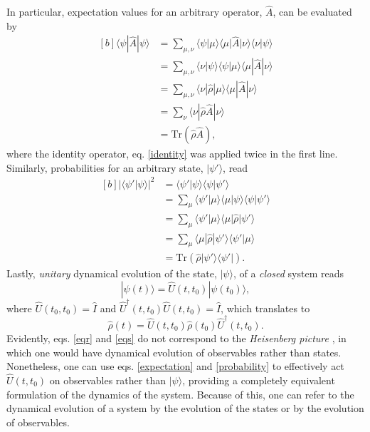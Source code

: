 \documentclass[
12pt,		%
openright,	%
twoside,  %
a4paper,			%
chapter=TITLE,		%
english,			%
french,				%
spanish,			%
brazil				%
]{USPSC-classe/USPSC}
\begin{document}
\begin{apendicesenv}
In particular, expectation values for an arbitrary operator, $\hat{A}$, can be evaluated by
\begin{equation}\label{expectation}
\begin{aligned}[b]
\langle\psi|\hat{A}|\psi\rangle &= \sum_{\mu,\nu}\langle\psi|\mu\rangle\langle\mu|\hat{A}|\nu\rangle\langle\nu|\psi\rangle\\
&=\sum_{\mu,\nu}\langle\nu|\psi\rangle\langle\psi|\mu\rangle\langle\mu|\hat{A}|\nu\rangle\\
&=\sum_{\mu,\nu}\langle\nu|\hat{\rho}|\mu\rangle\langle\mu|\hat{A}|\nu\rangle\\
&=\sum_{\nu}\langle\nu|\hat{\rho}\hat{A}|\nu\rangle\\
&=\text{Tr}\left(\hat{\rho}\hat{A}\right),    
\end{aligned}
\end{equation}
where the identity operator, eq. \ref{identity} was applied twice in the first line. Similarly, probabilities for an arbitrary state, $|\psi'\rangle$, read
\begin{equation}\label{probability}
\begin{aligned}[b]
     |\langle\psi'|\psi\rangle|^2 &= \langle\psi'|\psi\rangle\langle\psi|\psi'\rangle\\
     &=\sum_{\mu}\langle\psi'|{\mu}\rangle\langle{\mu}|\psi\rangle\langle\psi|\psi'\rangle\\
     &=\sum_{\mu}\langle\psi'|{\mu}\rangle\langle{\mu}|\hat{\rho}|\psi'\rangle\\
     &=\sum_{\mu}\langle{\mu}|\hat{\rho}|\psi'\rangle\langle\psi'|{\mu}\rangle\\
     &= \text{Tr}\left(\hat{\rho}|\psi'\rangle\langle\psi'|\right).
     \end{aligned}
 \end{equation}
Lastly, \textit{unitary} dynamical evolution of the state, $|\psi\rangle$, of a \textit{closed} system reads
\begin{equation}\label{eqr}
    |\psi(t)\rangle=\hat{U}(t,t_0)|\psi(t_0)\rangle,
\end{equation}
where $\hat{U}(t_0,t_0)=\hat{I}$ and $\hat{U}^{\dagger}(t,t_0)\hat{U}(t,t_0)=\hat{I}$, which translates to 
\begin{equation}\label{eqs}
    \hat{\rho}(t)=\hat{U}(t,t_0)\hat{\rho}(t_0)\hat{U}^{\dagger}(t,t_0).
\end{equation}
Evidently, eqs. \ref{eqr} and \ref{eqs} do not correspond to the \textit{Heisenberg picture} \cite{Sakurai1994}, in which one would have dynamical evolution of observables rather than states. Nonetheless, one can use eqs. \ref{expectation} and \ref{probability} to effectively act $\hat{U}(t,t_0)$ on observables rather than $|\psi\rangle$, providing a completely equivalent formulation of the dynamics of the system. Because of this, one can refer to the dynamical evolution of a system by the evolution of the states or by the evolution of observables.


\end{apendicesenv}
\end{document}
